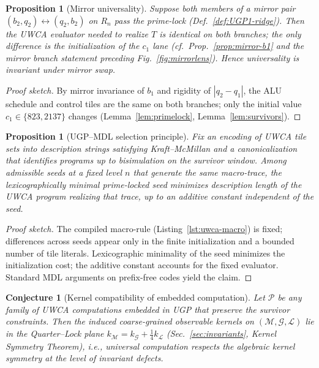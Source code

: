 \documentclass[12pt]{article}
\newtheorem{proposition}[theorem]{Proposition}
\newtheorem{conjecture}[theorem]{Conjecture}
\numberwithin{equation}{section}
\newcommand{\M}{\mathcal{M}}
\newcommand{\G}{\mathcal{G}}
\newcommand{\LL}{\mathcal{L}}
\begin{document}
\begin{proposition}[Mirror universality]\label{prop:mirror-univ}
Suppose both members of a mirror pair $(b_2,q_2)\leftrightarrow(q_2,b_2)$ on $R_n$ pass the prime-lock (Def.~\ref{def:UGP1-ridge}). Then the UWCA evaluator needed to realize $T$ is identical on both branches; the only difference is the initialization of the $c_1$ lane (cf.\ Prop.~\ref{prop:mirror-b1} and the mirror branch statement preceding Fig.~\ref{fig:mirrorlens}). Hence universality is invariant under mirror swap.
\end{proposition}

\begin{proof}[Proof sketch]
By mirror invariance of $b_1$ and rigidity of $|q_2{-}q_1|$, the ALU schedule and control tiles are the same on both branches; only the initial value $c_1\in\{823,2137\}$ changes (Lemma~\ref{lem:primelock}, Lemma~\ref{lem:survivors}).
\end{proof}

\begin{proposition}[UGP–MDL selection principle]\label{prop:mdl}
Fix an encoding of UWCA tile sets into description strings satisfying Kraft–McMillan and a canonicalization that identifies programs up to bisimulation on the survivor window. Among admissible seeds at a fixed level $n$ that generate the same macro-trace, the lexicographically minimal prime-locked seed minimizes description length of the UWCA program realizing that trace, up to an additive constant independent of the seed.
\end{proposition}

\begin{proof}[Proof sketch]
The compiled macro-rule (Listing~\ref{lst:uwca-macro}) is fixed; differences across seeds appear only in the finite initialization and a bounded number of tile literals. Lexicographic minimality of the seed minimizes the initialization cost; the additive constant accounts for the fixed evaluator. Standard MDL arguments on prefix-free codes yield the claim.
\end{proof}

\begin{conjecture}[Kernel compatibility of embedded computation]\label{conj:kernel-compat}
Let $\mathcal{P}$ be any family of UWCA computations embedded in UGP that preserve the survivor constraints. Then the induced coarse-grained observable kernels on $(\M,\G,\LL)$ lie in the Quarter–Lock plane $k_{\M}=k_{\G}+\tfrac14 k_{\LL}$ (Sec.~\ref{sec:invariants}, Kernel Symmetry Theorem), i.e., universal computation respects the algebraic kernel symmetry at the level of invariant defects.
\end{conjecture}
\end{document}
